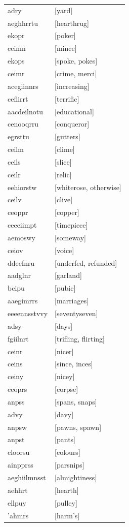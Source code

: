 \documentclass{article}
\begin{document}
\begin{tabular}{ll}
adry & [yard] \\
aeghhrrtu & [hearthrug] \\
ekopr & [poker] \\
ceimn & [mince] \\
ekops & [spoke, pokes] \\
ceimr & [crime, merci] \\
acegiinnrs & [increasing] \\
cefiirrt & [terrific] \\
aacdeilnotu & [educational] \\
cenooqrru & [conqueror] \\
egrsttu & [gutters] \\
ceilm & [clime] \\
ceils & [slice] \\
ceilr & [relic] \\
eehiorstw & [whiterose, otherwise] \\
ceilv & [clive] \\
ceoppr & [copper] \\
ceeeiimpt & [timepiece] \\
aemoswy & [someway] \\
ceiov & [voice] \\
ddeefnru & [underfed, refunded] \\
aadglnr & [garland] \\
bcipu & [pubic] \\
aaegimrrs & [marriages] \\
eeeennsstvvy & [seventyseven] \\
adsy & [days] \\
fgiilnrt & [trifling, flirting] \\
ceinr & [nicer] \\
ceins & [since, inces] \\
ceiny & [nicey] \\
ceoprs & [corpse] \\
anpss & [spans, snaps] \\
advy & [davy] \\
anpsw & [pawns, spawn] \\
anpst & [pants] \\
cloorsu & [colours] \\
ainpprss & [parsnips] \\
aeghiilmnsst & [almightiness] \\
aehhrt & [hearth] \\
ellpuy & [pulley] \\
'ahmrs & [harm's] \\

\end{tabular}
\end{document}

